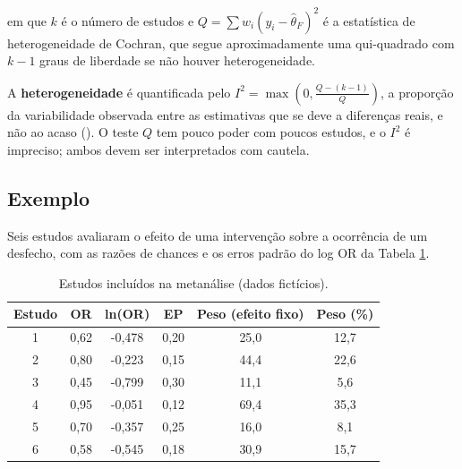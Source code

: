 \documentclass[
]{book}
\begin{document}
em que \(k\) é o número de estudos e \(Q = \sum w_i (y_i - \hat{\theta}_F)^2\) é a estatística de heterogeneidade de Cochran, que segue aproximadamente uma qui-quadrado com \(k - 1\) graus de liberdade se não houver heterogeneidade.

A \textbf{heterogeneidade} é quantificada pelo \(I^2 = \max\left(0, \frac{Q - (k - 1)}{Q}\right)\), a proporção da variabilidade observada entre as estimativas que se deve a diferenças reais, e não ao acaso (). O teste \(Q\) tem pouco poder com poucos estudos, e o \(I^2\) é impreciso; ambos devem ser interpretados com cautela.

\subsection{Exemplo}\label{exemplo-1}

Seis estudos avaliaram o efeito de uma intervenção sobre a ocorrência de um desfecho, com as razões de chances e os erros padrão do log OR da Tabela \ref{tab:av-meta-tab}.

\begin{table}

\caption{\label{tab:av-meta-tab}Estudos incluídos na metanálise (dados fictícios).}
\centering
\begin{tabular}[t]{c|c|c|c|c|c}
\hline
Estudo & OR & ln(OR) & EP & Peso (efeito fixo) & Peso (\%)\\
\hline
1 & 0,62 & -0,478 & 0,20 & 25,0 & 12,7\\
\hline
2 & 0,80 & -0,223 & 0,15 & 44,4 & 22,6\\
\hline
3 & 0,45 & -0,799 & 0,30 & 11,1 & 5,6\\
\hline
4 & 0,95 & -0,051 & 0,12 & 69,4 & 35,3\\
\hline
5 & 0,70 & -0,357 & 0,25 & 16,0 & 8,1\\
\hline
6 & 0,58 & -0,545 & 0,18 & 30,9 & 15,7\\
\hline
\end{tabular}
\end{table}
\end{document}
